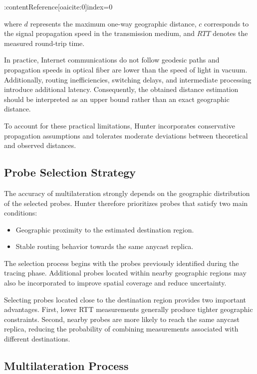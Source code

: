 :contentReference[oaicite:0]{index=0}

where $d$ represents the maximum one-way geographic distance, $c$ corresponds to the signal propagation speed in the transmission medium, and $RTT$ denotes the measured round-trip time.

In practice, Internet communications do not follow geodesic paths and propagation speeds in optical fiber are lower than the speed of light in vacuum. Additionally, routing inefficiencies, switching delays, and intermediate processing introduce additional latency. Consequently, the obtained distance estimation should be interpreted as an upper bound rather than an exact geographic distance.

To account for these practical limitations, Hunter incorporates conservative propagation assumptions and tolerates moderate deviations between theoretical and observed distances.

\subsection{Probe Selection Strategy}

The accuracy of multilateration strongly depends on the geographic distribution of the selected probes. Hunter therefore prioritizes probes that satisfy two main conditions:

\begin{itemize}
    \item Geographic proximity to the estimated destination region.
    \item Stable routing behavior towards the same anycast replica.
\end{itemize}

The selection process begins with the probes previously identified during the tracing phase. Additional probes located within nearby geographic regions may also be incorporated to improve spatial coverage and reduce uncertainty.

Selecting probes located close to the destination region provides two important advantages. First, lower RTT measurements generally produce tighter geographic constraints. Second, nearby probes are more likely to reach the same anycast replica, reducing the probability of combining measurements associated with different destinations.

\subsection{Multilateration Process}

